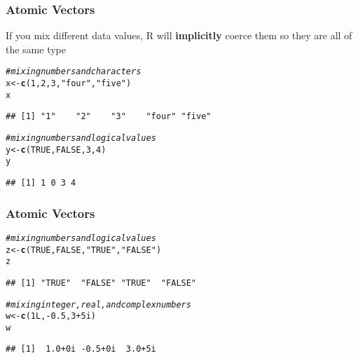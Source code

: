 \documentclass[12pt]{beamer}\usepackage[]{graphicx}\usepackage[]{color}
\makeatletter
\newcommand{\hlnum}[1]{\textcolor[rgb]{0.686,0.059,0.569}{#1}}%
\newcommand{\hlstr}[1]{\textcolor[rgb]{0.192,0.494,0.8}{#1}}%
\newcommand{\hlcom}[1]{\textcolor[rgb]{0.678,0.584,0.686}{\textit{#1}}}%
\newcommand{\hlopt}[1]{\textcolor[rgb]{0,0,0}{#1}}%
\newcommand{\hlstd}[1]{\textcolor[rgb]{0.345,0.345,0.345}{#1}}%
\newcommand{\hlkwb}[1]{\textcolor[rgb]{0.69,0.353,0.396}{#1}}%
\newcommand{\hlkwd}[1]{\textcolor[rgb]{0.737,0.353,0.396}{\textbf{#1}}}%
\newenvironment{kframe}{%
 \def\at@end@of@kframe{}%
 \ifinner\ifhmode%
  \def\at@end@of@kframe{\end{minipage}}%
  \begin{minipage}{\columnwidth}%
 \fi\fi%
 \def\FrameCommand##1{\hskip\@totalleftmargin \hskip-\fboxsep
 \colorbox{shadecolor}{##1}\hskip-\fboxsep
     \hskip-\linewidth \hskip-\@totalleftmargin \hskip\columnwidth}%
 \MakeFramed {\advance\hsize-\width
   \@totalleftmargin\z@ \linewidth\hsize
   \@setminipage}}%
 {\par\unskip\endMakeFramed%
 \at@end@of@kframe}
\newenvironment{knitrout}{}{} %
\makeatother
\begin{document}

\begin{frame}[fragile]
\frametitle{Atomic Vectors}

If you mix different data values, R will \textbf{implicitly} coerce them so they are all of the same type
\begin{knitrout}\footnotesize
{}\color{fgcolor}\begin{kframe}
\begin{alltt}
\hlcom{# mixing numbers and characters}
\hlstd{x} \hlkwb{<-} \hlkwd{c}\hlstd{(}\hlnum{1}\hlstd{,} \hlnum{2}\hlstd{,} \hlnum{3}\hlstd{,} \hlstr{"four"}\hlstd{,} \hlstr{"five"}\hlstd{)}
\hlstd{x}
\end{alltt}
\begin{verbatim}
## [1] "1"    "2"    "3"    "four" "five"
\end{verbatim}
\begin{alltt}
\hlcom{# mixing numbers and logical values}
\hlstd{y} \hlkwb{<-} \hlkwd{c}\hlstd{(}\hlnum{TRUE}\hlstd{,} \hlnum{FALSE}\hlstd{,} \hlnum{3}\hlstd{,} \hlnum{4}\hlstd{)}
\hlstd{y}
\end{alltt}
\begin{verbatim}
## [1] 1 0 3 4
\end{verbatim}
\end{kframe}
\end{knitrout}

\end{frame}


\begin{frame}[fragile]
\frametitle{Atomic Vectors}

\begin{knitrout}\footnotesize
{}\color{fgcolor}\begin{kframe}
\begin{alltt}
\hlcom{# mixing numbers and logical values}
\hlstd{z} \hlkwb{<-} \hlkwd{c}\hlstd{(}\hlnum{TRUE}\hlstd{,} \hlnum{FALSE}\hlstd{,} \hlstr{"TRUE"}\hlstd{,} \hlstr{"FALSE"}\hlstd{)}
\hlstd{z}
\end{alltt}
\begin{verbatim}
## [1] "TRUE"  "FALSE" "TRUE"  "FALSE"
\end{verbatim}
\begin{alltt}
\hlcom{# mixing integer, real, and complex numbers}
\hlstd{w} \hlkwb{<-} \hlkwd{c}\hlstd{(}\hlnum{1L}\hlstd{,} \hlopt{-}\hlnum{0.5}\hlstd{,} \hlnum{3} \hlopt{+} \hlnum{5i}\hlstd{)}
\hlstd{w}
\end{alltt}
\begin{verbatim}
## [1]  1.0+0i -0.5+0i  3.0+5i
\end{verbatim}
\end{kframe}
\end{knitrout}

\end{frame}
\end{document}
